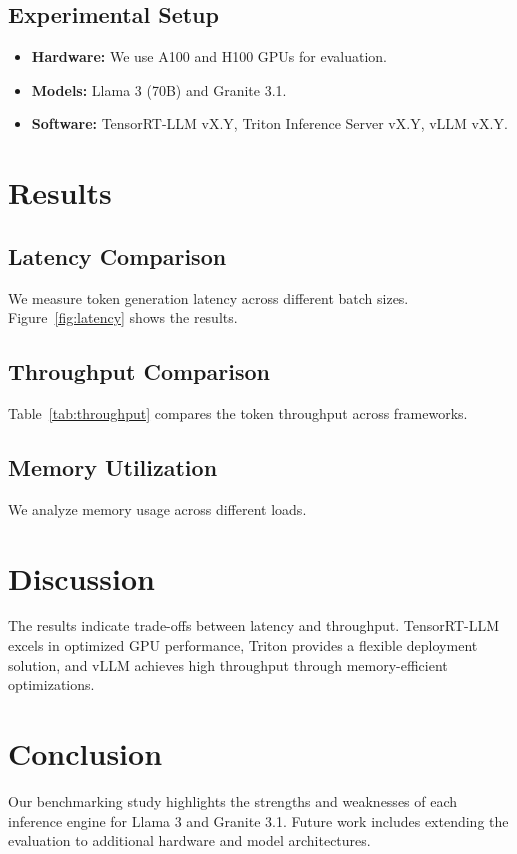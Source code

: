 \documentclass{article}
\begin{document}
\subsection{Experimental Setup}
\begin{itemize}
    \item \textbf{Hardware:} We use A100 and H100 GPUs for evaluation.
    \item \textbf{Models:} Llama 3 (70B) and Granite 3.1.
    \item \textbf{Software:} TensorRT-LLM vX.Y, Triton Inference Server vX.Y, vLLM vX.Y.
\end{itemize}

\section{Results}
\subsection{Latency Comparison}
We measure token generation latency across different batch sizes. Figure~\ref{fig:latency} shows the results.

\subsection{Throughput Comparison}
Table~\ref{tab:throughput} compares the token throughput across frameworks.

\subsection{Memory Utilization}
We analyze memory usage across different loads.

\section{Discussion}
The results indicate trade-offs between latency and throughput. TensorRT-LLM excels in optimized GPU performance, Triton provides a flexible deployment solution, and vLLM achieves high throughput through memory-efficient optimizations.

\section{Conclusion}
Our benchmarking study highlights the strengths and weaknesses of each inference engine for Llama 3 and Granite 3.1. Future work includes extending the evaluation to additional hardware and model architectures.



\end{document}
